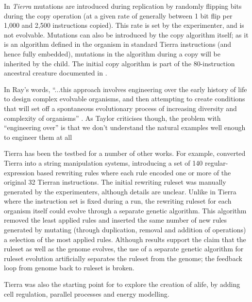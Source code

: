In \emph{Tierra} \parencite{Ray1991} mutations are introduced during replication by randomly flipping bits during the copy operation (at a given rate of generally between 1 bit flip per 1,000 and 2,500 instructions copied). This rate is set by the experimenter, and is not evolvable. Mutations can also be introduced by the copy algorithm itself; as it is an algorithm defined in the organism in standard Tierra instructions (and hence fully embedded), mutations in the algorithm during a copy will be inherited by the child. The initial copy algorithm is part of the 80-instruction ancestral creature documented in \textcite[app.C]{Ray1991}.

In Ray's words, ``...this approach involves engineering over the early history of life to design complex evolvable organisms, and then attempting to create conditions that will set off a spontaneous evolutionary process of increasing diversity and complexity of organisms'' \parencite[p.3]{Ray1991}. As Taylor criticises though, the problem with ``engineering over'' is that we don't understand the natural examples well enough to engineer them at all \parencite{Taylor2001}

Tierra has been the testbed for a number of other works. For example, \textcite{SugiuraSuzukiShioseEtAl2003} converted Tierra into a string manipulation systems, introducing a set of 140 regular-expression based rewriting rules where each rule encoded one or more of the original 32 Tierran instructions. The initial rewriting ruleset was manually generated by the experimenters, although details are unclear. Unlike in Tierra where the instruction set is fixed during a run, the rewriting ruleset for each organism itself could evolve through a separate genetic algorithm. This algorithm removed the least applied rules and inserted the same number of new rules generated by mutating (through duplication, removal and addition of operations) a selection of the most applied rules. Although results support the claim that the ruleset as well as the genome evolves, the use of a separate genetic algorithm for ruleset evolution artificially separates the ruleset from the genome; the feedback loop from genome back to ruleset is broken.

Tierra was also the starting point for \textcite{Taylor2001, Taylor:1999sc} to explore the creation of \gls{alife}, by adding cell regulation, parallel processes and energy modelling.


